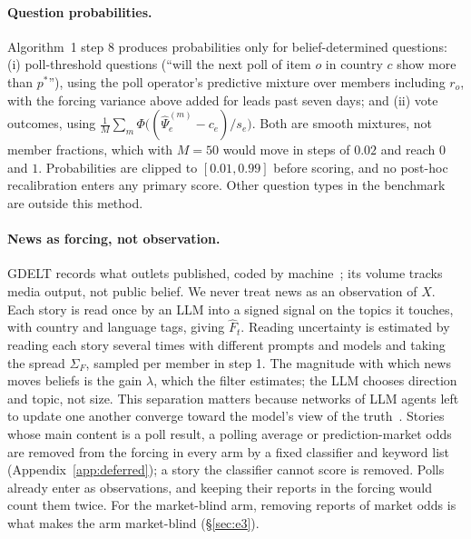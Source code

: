 \documentclass[10pt]{article}
\theoremstyle{remark}
\begin{document}
\paragraph{Question probabilities.} Algorithm~1 step 8 produces probabilities only for belief-determined questions: (i) poll-threshold questions (``will the next poll of item $o$ in country $c$ show more than $p^\ast$''), using the poll operator's predictive mixture over members including $r_o$, with the forcing variance above added for leads past seven days; and (ii) vote outcomes, using $\frac1M\sum_m\Phi\big((\hat\Psi^{(m)}_e-c_e)/s_e\big)$. Both are smooth mixtures, not member fractions, which with $M=50$ would move in steps of $0.02$ and reach $0$ and $1$. Probabilities are clipped to $[0.01,0.99]$ before scoring, and no post-hoc recalibration enters any primary score. Other question types in the benchmark~\cite{rw_bench} are outside this method.

\paragraph{News as forcing, not observation.} GDELT records what outlets published, coded by machine~\cite{leetaru2013}; its volume tracks media output, not public belief. We never treat news as an observation of $X$. Each story is read once by an LLM into a signed signal on the topics it touches, with country and language tags, giving $\hat F_t$. Reading uncertainty is estimated by reading each story several times with different prompts and models and taking the spread $\Sigma_F$, sampled per member in step 1. The magnitude with which news moves beliefs is the gain $\lambda$, which the filter estimates; the LLM chooses direction and topic, not size. This separation matters because networks of LLM agents left to update one another converge toward the model's view of the truth~\cite{chuang2023}. Stories whose main content is a poll result, a polling average or prediction-market odds are removed from the forcing in every arm by a fixed classifier and keyword list (Appendix~\ref{app:deferred}); a story the classifier cannot score is removed. Polls already enter as observations, and keeping their reports in the forcing would count them twice. For the market-blind arm, removing reports of market odds is what makes the arm market-blind (\S\ref{sec:e3}).
\end{document}
